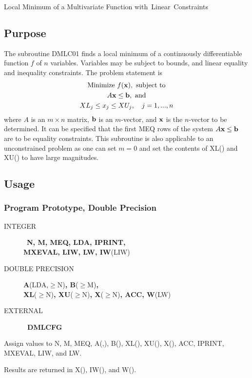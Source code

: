 \documentclass[twoside]{MATH77}
\begin{document}
 Local Minimum of a Multivariate Function \hbox{with Linear Constraints}


\subsection{Purpose}

The subroutine DMLC01 finds a local minimum of a continuously differentiable
function $f$ of $n$ variables. Variables may be subject to bounds, and
linear equality and inequality constraints. The problem statement is%
\begin{gather}
\text{Minimize }f({\bf x}),\text{ subject to}\notag\\
\label{O1}A{\bf x} \leq {\bf b},\text{ and}\\
\label{O2}XL_j\leq x_j\leq XU_j,\quad j=1,...,n
\end{gather}
where $A$ is an $m\times n$ matrix, ${\bf b}$ is an $m$-vector, and ${\bf x}$ is
the $n $-vector to be determined. It can be specified that the first MEQ
rows of the system $A{\bf x} \leq  {\bf b}$ are to be equality constraints.
This subroutine is also applicable to an unconstrained problem as one can
set $m=0 $ and set the contents of XL() and XU() to have large magnitudes.

\subsection{Usage}

\subsubsection{Program Prototype, Double Precision}
\begin{description}
\item[INTEGER]  \ {\bf N, M, MEQ, LDA, IPRINT,\\ MXEVAL, LIW, LW, IW}(LIW)
\item[DOUBLE PRECISION]  {\bf A}(LDA,$\geq $N){\bf , B}($\geq $M){\bf ,\\
XL}($\geq $N){\bf, XU}($\geq $N){\bf , X}($\geq $N){\bf, ACC, W}(LW)
\item[EXTERNAL]  {\bf \ DMLCFG }
\end{description}
Assign values to N, M, MEQ, A(,), B(), XL(), XU(), X(), ACC, IPRINT, MXEVAL,
LIW, and LW.
\begin{center}
\end{center}
Results are returned in X(), IW(), and W().
\end{document}
